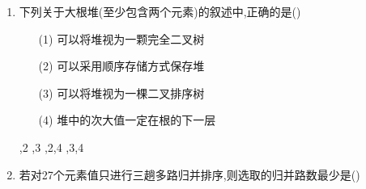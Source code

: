 \documentclass[12pt, a4paper, oneside, UTF8]{ctexbook}
\begin{document}
\begin{enumerate}
{{        }
    }
    \item 下列关于大根堆(至少包含两个元素)的叙述中,正确的是()
    \begin{enumerate}
        \item [(1)]可以将堆视为一颗完全二叉树
        \item [(2)]可以采用顺序存储方式保存堆
        \item [(3)]可以将堆视为一棵二叉排序树
        \item [(4)]堆中的次大值一定在根的下一层
    \end{enumerate}
    \begin{choices}
        ,2
        ,3
        ,2,4
        ,3,4
    \end{choices}

    \item 若对27个元素值只进行三趟多路归并排序,则选取的归并路数最少是() 
    \begin{choices}
    \end{choices}


\end{enumerate}
\end{document}
